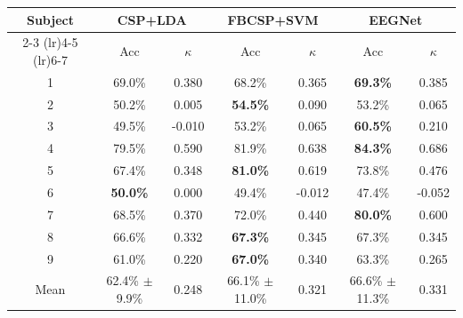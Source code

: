 \begin{tabular}{ccccccc}
\toprule
Subject & \multicolumn{2}{c}{CSP+LDA} & \multicolumn{2}{c}{FBCSP+SVM} & \multicolumn{2}{c}{EEGNet} \\
\cmidrule(lr){2-3} \cmidrule(lr){4-5} \cmidrule(lr){6-7}
 & Acc & $\kappa$ & Acc & $\kappa$ & Acc & $\kappa$ \\
\midrule
1 & 69.0\% & 0.380 & 68.2\% & 0.365 & \textbf{69.3\%} & 0.385 \\
2 & 50.2\% & 0.005 & \textbf{54.5\%} & 0.090 & 53.2\% & 0.065 \\
3 & 49.5\% & -0.010 & 53.2\% & 0.065 & \textbf{60.5\%} & 0.210 \\
4 & 79.5\% & 0.590 & 81.9\% & 0.638 & \textbf{84.3\%} & 0.686 \\
5 & 67.4\% & 0.348 & \textbf{81.0\%} & 0.619 & 73.8\% & 0.476 \\
6 & \textbf{50.0\%} & 0.000 & 49.4\% & -0.012 & 47.4\% & -0.052 \\
7 & 68.5\% & 0.370 & 72.0\% & 0.440 & \textbf{80.0\%} & 0.600 \\
8 & 66.6\% & 0.332 & \textbf{67.3\%} & 0.345 & 67.3\% & 0.345 \\
9 & 61.0\% & 0.220 & \textbf{67.0\%} & 0.340 & 63.3\% & 0.265 \\
\midrule
Mean & 62.4\% $\pm$ 9.9\% & 0.248 & 66.1\% $\pm$ 11.0\% & 0.321 & 66.6\% $\pm$ 11.3\% & 0.331 \\
\bottomrule
\end{tabular}